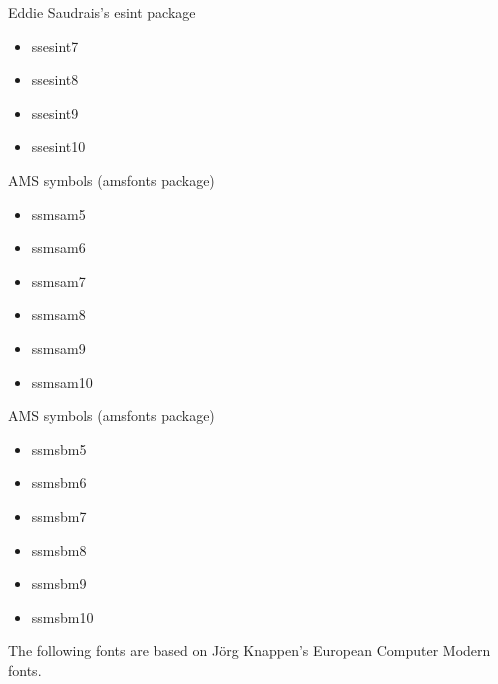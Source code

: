 \documentclass{amsart}
\begin{document}
\nobreak

\noindent{}\textwidth\parbox[t]{0.31\textwidth}{
\raggedright
Eddie Saudrais's \textsf{esint} package
\begin{itemize}[leftmargin=*]
\item \textsf{ssesint7}
\item \textsf{ssesint8}
\item \textsf{ssesint9}
\item \textsf{ssesint10}
\end{itemize}}\parbox[t]{0.31\textwidth}{
\raggedright
AMS symbols (\textsf{amsfonts} package)
\begin{itemize}[leftmargin=*]
\item \textsf{ssmsam5}
\item \textsf{ssmsam6}
\item \textsf{ssmsam7}
\item \textsf{ssmsam8}
\item \textsf{ssmsam9}
\item \textsf{ssmsam10}
\end{itemize}}\parbox[t]{0.31\textwidth}{
\raggedright
AMS symbols (\textsf{amsfonts} package)
\begin{itemize}[leftmargin=*]
\item \textsf{ssmsbm5}
\item \textsf{ssmsbm6}
\item \textsf{ssmsbm7}
\item \textsf{ssmsbm8}
\item \textsf{ssmsbm9}
\item \textsf{ssmsbm10}
\end{itemize}}

\bigskip

The following fonts are based on J\"org Knappen's European Computer Modern fonts.

\nobreak
\end{document}

